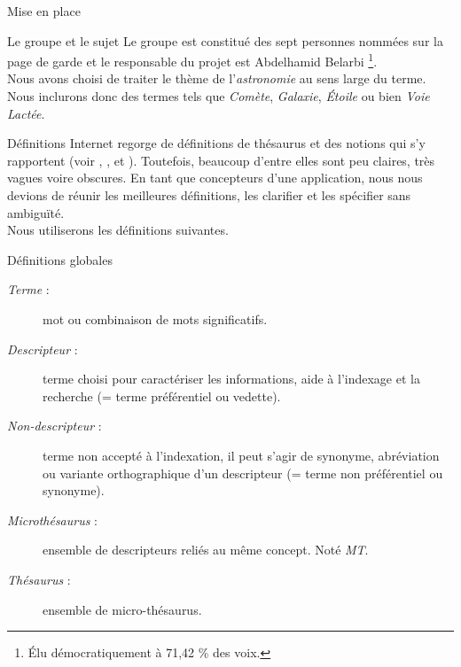 \documentclass[a4paper, 12pt]{report}
\begin{document}
\begin{chapter}{Mise en place}
	\begin{section}{Le groupe et le sujet}
		Le groupe est constitué des sept personnes nommées sur la page de garde et le responsable du projet est Abdelhamid Belarbi
		\footnote{Élu démocratiquement à 71,42 \% des voix.}.\\
		Nous avons choisi de traiter le thème de l’\emph{astronomie} au sens large du terme. Nous inclurons donc des termes tels que \emph{Comète},
		\emph{Galaxie}, \emph{Étoile} ou bien \emph{Voie Lactée}.
	\end{section}
	
	\begin{section}{Définitions}\label{aspic}
		Internet regorge de définitions de thésaurus et des notions qui s’y rapportent (voir \cite{Wikipedia}, \cite{Inpes}, \cite{Bdsp} et \cite{Unesco}).
		Toutefois, beaucoup d’entre elles sont peu claires, très vagues voire obscures. En tant que concepteurs d’une application, nous nous devions de réunir les
		meilleures définitions, les clarifier et les spécifier sans ambiguïté.\\
		
		
		
		\noindent
		Nous utiliserons les définitions suivantes.
		\begin{subsection}{Définitions globales}
			\begin{description}
				\item[\emph{Terme} :] mot ou combinaison de mots significatifs.
				\item[\emph{Descripteur} :] terme choisi pour caractériser les informations, aide à l'indexage et la recherche (= terme préférentiel ou vedette).
				\item[\emph{Non-descripteur} :] terme non accepté à l'indexation, il peut s'agir de synonyme, abréviation ou variante orthographique d'un descripteur
				(= terme non préférentiel ou
				synonyme).
				\item[\emph{Microthésaurus} :] ensemble de descripteurs reliés au même concept. Noté \emph{MT}.
				\item[\emph{Thésaurus} :] ensemble de micro-thésaurus.
			\end{description}
		\end{subsection}
		

\end{section}
\end{chapter}
\end{document}
